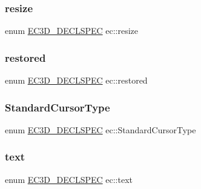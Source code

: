\mbox{\label{namespaceec_a84e452d7f020435b50e2c18e7cdca968}} 
\subsubsection{\texorpdfstring{resize}{resize}}
{\footnotesize\ttfamily enum \mbox{\hyperlink{_common_8h_aac42573e202ca3dd4d259c81691e2369}{E\+C3\+D\+\_\+\+D\+E\+C\+L\+S\+P\+EC}} ec\+::resize\hspace{0.3cm}{\ttfamily [strong]}}

\mbox{\label{namespaceec_af316093f3fa4161f332a168bd91d598e}} 
\subsubsection{\texorpdfstring{restored}{restored}}
{\footnotesize\ttfamily enum \mbox{\hyperlink{_common_8h_aac42573e202ca3dd4d259c81691e2369}{E\+C3\+D\+\_\+\+D\+E\+C\+L\+S\+P\+EC}} ec\+::restored\hspace{0.3cm}{\ttfamily [strong]}}

\mbox{\label{namespaceec_ab32dc7f72e1021f7625fca2b4693d297}} 
\subsubsection{\texorpdfstring{Standard\+Cursor\+Type}{StandardCursorType}}
{\footnotesize\ttfamily enum \mbox{\hyperlink{_common_8h_aac42573e202ca3dd4d259c81691e2369}{E\+C3\+D\+\_\+\+D\+E\+C\+L\+S\+P\+EC}} ec\+::\+Standard\+Cursor\+Type\hspace{0.3cm}{\ttfamily [strong]}}

\mbox{\label{namespaceec_a0bdee24285d69deca899e166b29c0150}} 
\subsubsection{\texorpdfstring{text}{text}}
{\footnotesize\ttfamily enum \mbox{\hyperlink{_common_8h_aac42573e202ca3dd4d259c81691e2369}{E\+C3\+D\+\_\+\+D\+E\+C\+L\+S\+P\+EC}} ec\+::text\hspace{0.3cm}{\ttfamily [strong]}}

